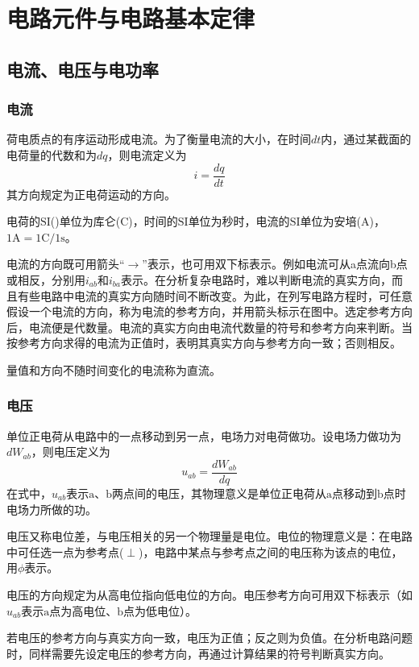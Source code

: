 \chapter{电路元件与电路基本定律}

\section{电流、电压与电功率}
\subsection{电流}
荷电质点的有序运动形成电流。为了衡量电流的大小，在时间$dt$内，通过某截面的电荷量的代数和为$dq$，则电流定义为
\[
i=\frac{dq}{dt}
\]
其方向规定为正电荷运动的方向。

电荷的$\mathrm{SI}$()单位为库仑($\mathrm{C}$)，时间的$\mathrm{SI}$单位为秒时，电流的$\mathrm{SI}$单位为安培($\mathrm{A}$)，$1\mathrm{A}=1\mathrm{C}/1\mathrm{s}$。

电流的方向既可用箭头“$\rightarrow$”表示，也可用双下标表示。例如电流可从a点流向b点或相反，分别用$i_{ab}$和$i_{ba}$表示。在分析复杂电路时，难以判断电流的真实方向，而且有些电路中电流的真实方向随时间不断改变。为此，在列写电路方程时，可任意假设一个电流的方向，称为电流的参考方向，并用箭头标示在图中。选定参考方向后，电流便是代数量。电流的真实方向由电流代数量的符号和参考方向来判断。当按参考方向求得的电流为正值时，表明其真实方向与参考方向一致；否则相反。

量值和方向不随时间变化的电流称为直流。

\subsection{电压}
单位正电荷从电路中的一点移动到另一点，电场力对电荷做功。设电场力做功为$dW_{ab}$，则电压定义为
\[
u_{ab}=\frac{dW_{ab}}{dq}
\]
在式中，$u_{ab}$表示$\text{a、b}$两点间的电压，其物理意义是单位正电荷从$\text{a}$点移动到$\text{b}$点时电场力所做的功。

电压又称电位差，与电压相关的另一个物理量是电位。电位的物理意义是：在电路中可任选一点为参考点($\perp$)，电路中某点与参考点之间的电压称为该点的电位，用$\phi$表示。

电压的方向规定为从高电位指向低电位的方向。电压参考方向可用双下标表示（如$u_{ab}$表示$\text{a}$点为高电位、$\text{b}$点为低电位）。

若电压的参考方向与真实方向一致，电压为正值；反之则为负值。在分析电路问题时，同样需要先设定电压的参考方向，再通过计算结果的符号判断真实方向。

